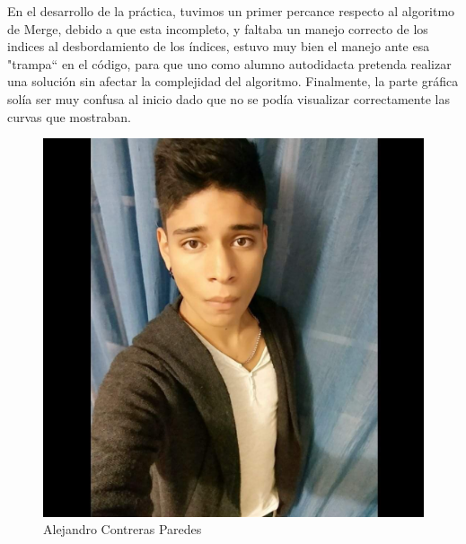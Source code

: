 \documentclass[12pt,twoside]{article}
\begin{document}
En el desarrollo de la práctica, tuvimos un primer percance respecto al algoritmo de Merge, debido a que esta incompleto, y faltaba un manejo
correcto de los indices al desbordamiento de los índices, estuvo muy bien el manejo ante esa "trampa`` en el código, para que uno como alumno
autodidacta pretenda realizar una solución sin afectar la complejidad del algoritmo. Finalmente, la parte gráfica solía ser muy confusa al inicio
dado que no se podía visualizar correctamente las curvas que mostraban. 
\begin{figure}[!h]
	\centering
	\begin{minipage}[t]{10cm}
		\centering
		\includegraphics[scale=0.2]{Foto1}
		\caption{Alejandro Contreras Paredes}
	\end{minipage}
	\hspace{18cm}
	\begin{minipage}[t]{10cm}
		\centering

\end{minipage}
\end{figure}
\end{document}
